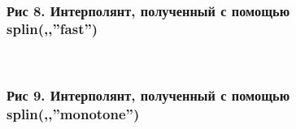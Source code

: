 \documentclass[russian,utf8,nocolumnxxxi,nocolumnxxxii]{eskdtext}
\begin{document}
\begin{figure}[H]
\begin{center}
\begin{minipage}[h]{0.65\linewidth}
  \\
\frametitle{Рис 8. Интерполянт, полученный с помощью splin(,,”fast”)}
\end{minipage}
\end{center}
\end{figure}
\begin{figure}[H]
\begin{center}
\begin{minipage}[h]{0.65\linewidth}
  \\
\frametitle{Рис 9. Интерполянт, полученный с помощью splin(,,”monotone”)}
\end{minipage}
\end{center}
\end{figure}
\end{document}
